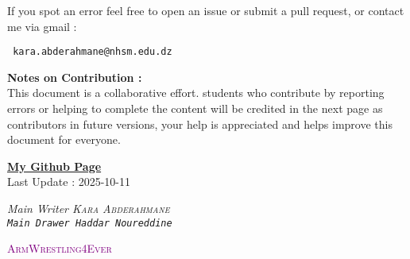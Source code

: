 \documentclass{report}
\begin{document}
\begin{titlepage}
  \begin{center}
    If you spot an error feel free to open an issue or
    submit a pull request, or contact me
    via gmail :
  \end{center}
  \begin{center}
    \normalfont
    \texttt{
      \large kara.abderahmane@nhsm.edu.dz
      \normalfont
    }
  \end{center}
  \noindent \textbf{Notes on Contribution : } \\
  This document is a collaborative effort.
  students who contribute by reporting errors or helping to complete the content
  will be credited in the next page as contributors in future versions,
  your help is appreciated and helps improve this document for everyone.
\end{titlepage}
\begin{titlepage}
  \newpage
  \normalfont
  \vfill
  \begin{center}
    \href{https://github.com/Kapa9102}{\textbf{My Github Page}}\\
    \vspace{0.8cm}
    Last Update : 2025-10-11
  \end{center}
  \begin{tcolorbox}[enhanced, colback=yellow!70!orange!20!white, sharp corners, boxrule=1pt,
    attach boxed title to top center = {yshift = -10pt, xshift = 0pt}, colbacktitle=yellow!30!orange!20!white,
    boxed title style = {boxrule=0pt, arc=4pt}, title=\sc\textcolor{black}{Contributors}]
    \begin{center}
      \it Main Writer \hfill \normalfont  \textsc{Kara Abderahmane}  \\
      \vspace{0.5cm}
      \tt Main Drawer \hfill \normalfont  \tt{Haddar Noureddine}  \\
    \end{center}
  \end{tcolorbox} 
  \vfill
  \begin{center}
   \textsc{\textcolor{purple}{\large ArmWrestling4Ever}}\normalfont
  \end{center}
\end{titlepage}
\tableofcontents



\end{document}
